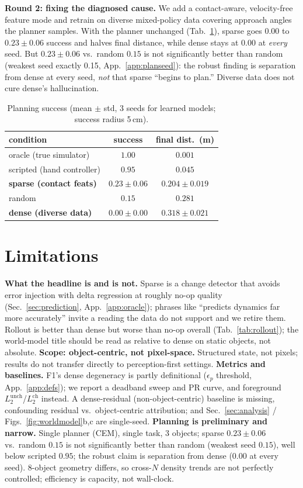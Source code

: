 \documentclass[conference]{IEEEtran}
\begin{document}
\textbf{Round 2: fixing the diagnosed cause.} We add a contact-aware, velocity-free
feature mode and retrain on diverse mixed-policy data covering approach angles the
planner samples. With the planner unchanged (Tab.~\ref{tab:planning}), sparse goes
0.00 to $0.23\pm0.06$ success and halves final distance, while dense stays at
$0.00$ at \emph{every} seed. But $0.23\pm0.06$ vs.\ random $0.15$ is not
significantly better than random (weakest seed exactly 0.15, App.~\ref{app:planseed}):
the robust finding is separation from dense at every seed, \emph{not} that sparse
``begins to plan.'' Diverse data does not cure dense's
hallucination.

\begin{table}[t]
\caption{Planning success (mean $\pm$ std, 3 seeds for learned models; success radius 5\,cm).}
\label{tab:planning}
\centering
\begin{tabular}{@{}lcc@{}}
\toprule
condition & success & final dist.\ (m) \\
\midrule
oracle (true simulator) & $1.00$ & $0.001$ \\
scripted (hand controller) & $0.95$ & $0.045$ \\
\textbf{sparse (contact feats)} & $\mathbf{0.23 \pm 0.06}$ & $\mathbf{0.204 \pm 0.019}$ \\
random & $0.15$ & $0.281$ \\
\textbf{dense (diverse data)} & $\mathbf{0.00 \pm 0.00}$ & $0.318 \pm 0.021$ \\
\bottomrule
\end{tabular}
\end{table}

\section{Limitations}\label{sec:limitations}
\textbf{What the headline is and is not.} Sparse is a change detector that avoids
error injection with delta regression at roughly no-op quality (Sec.~\ref{sec:prediction},
App.~\ref{app:oracle}); phrases like ``predicts dynamics far more accurately'' invite
a reading the data do not support and we retire them. Rollout is better than dense
but worse than no-op overall (Tab.~\ref{tab:rollout}); the world-model title should
be read as relative to dense on static objects, not absolute.
\textbf{Scope: object-centric, not pixel-space.} Structured state, not pixels; results
do not transfer directly to perception-first settings.
\textbf{Metrics and baselines.} F1's dense degeneracy is partly definitional
($\epsilon_p$ threshold, App.~\ref{app:defs}); we report a deadband sweep and PR
curve, and foreground $L_2^{\text{unch}}$/$L_2^{\text{ch}}$ instead. A dense-residual
(non-object-centric) baseline is missing, confounding residual vs.\ object-centric
attribution; and Sec.~\ref{sec:analysis} / Figs.~\ref{fig:worldmodel}b,c are single-seed.
\textbf{Planning is preliminary and narrow.} Single planner (CEM), single task, 3
objects; sparse $0.23\pm0.06$ vs.\ random $0.15$ is not significantly better than
random (weakest seed $0.15$), well below scripted $0.95$; the robust claim is
separation from dense ($0.00$ at every seed). 8-object geometry differs, so cross-$N$
density trends are not perfectly controlled; efficiency is capacity, not wall-clock.
\end{document}
